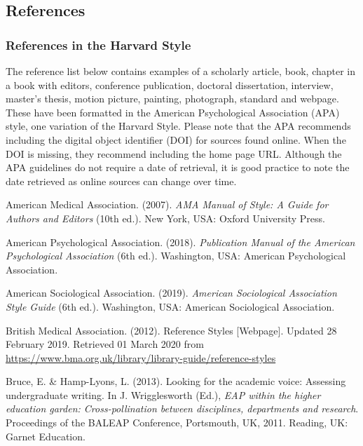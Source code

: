 \documentclass[english, 12pt, a4paper, sci, utf8, a-2b, online]{aaltothesis}
\begin{document}
\subsection*{References}
\subsubsection*{References in the Harvard Style}

The reference list below contains examples of a scholarly article, book, chapter
in a book with editors, conference publication, doctoral dissertation, 
interview, master’s thesis, motion picture, painting, photograph, standard and 
webpage. These have been formatted in the American Psychological Association 
(APA) style, one variation of the Harvard Style. Please note that the APA 
recommends including the digital object identifier (DOI) for sources found 
online. When the DOI is missing, they recommend including the home page URL. 
Although the APA guidelines do not require a date of retrieval, it is good 
practice to note the date retrieved as online sources can change over time.

\vspace{1ex}
\noindent
American Medical Association. (2007). 
\textit{AMA Manual of Style: A Guide for Authors and Editors} 
(10th ed.). New York, USA: Oxford University Press.

\vspace{1ex}
\noindent
American Psychological Association. (2018). 
\textit{Publication Manual of the American Psychological Association} 
(6th ed.). Washington, USA: American Psychological Association.

\vspace{1ex}
\noindent
American Sociological Association. (2019). 
\textit{American Sociological Association Style Guide} 
(6th ed.). Washington, USA: American Sociological Association.

\vspace{1ex}
\noindent
British Medical Association. (2012). 
Reference Styles [Webpage]. Updated 28 February 2019. 
Retrieved 01 March 2020 from 
\url{https://www.bma.org.uk/library/library-guide/reference-styles}

\vspace{1ex}
\noindent
Bruce, E. \& Hamp-Lyons, L. (2013). 
Looking for the academic voice: Assessing undergraduate writing. 
In J. Wrigglesworth (Ed.), 
\textit{EAP within the higher education garden: Cross-pollination between 
	disciplines, departments and research}. 
Proceedings of the BALEAP Conference, Portsmouth, UK, 2011. Reading, UK: Garnet
Education.
\end{document}
